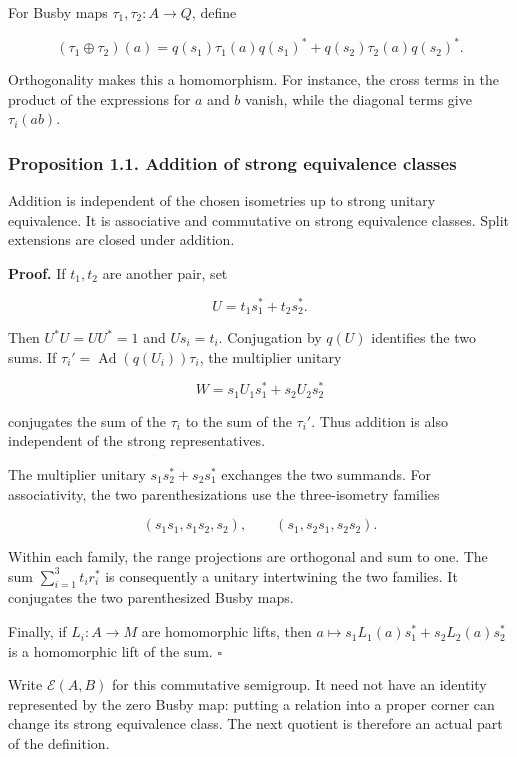 \documentclass[
  11pt,
]{article}
\begin{document}
For Busby maps \(\tau_1,\tau_2:A\to Q\), define

\[
(\tau_1\oplus\tau_2)(a)
=q(s_1)\tau_1(a)q(s_1)^*+q(s_2)\tau_2(a)q(s_2)^*.
\]

Orthogonality makes this a homomorphism. For instance, the cross terms
in the product of the expressions for \(a\) and \(b\) vanish, while the
diagonal terms give \(\tau_i(ab)\).

\subsubsection{Proposition 1.1. Addition of strong equivalence
classes}\label{proposition-1.1.-addition-of-strong-equivalence-classes}

Addition is independent of the chosen isometries up to strong unitary
equivalence. It is associative and commutative on strong equivalence
classes. Split extensions are closed under addition.

\textbf{Proof.} If \(t_1,t_2\) are another pair, set

\[
U=t_1s_1^*+t_2s_2^*.
\]

Then \(U^*U=UU^*=1\) and \(Us_i=t_i\). Conjugation by \(q(U)\)
identifies the two sums. If \(\tau_i'=\operatorname{Ad}(q(U_i))\tau_i\),
the multiplier unitary

\[
W=s_1U_1s_1^*+s_2U_2s_2^*
\]

conjugates the sum of the \(\tau_i\) to the sum of the \(\tau_i'\). Thus
addition is also independent of the strong representatives.

The multiplier unitary \(s_1s_2^*+s_2s_1^*\) exchanges the two summands.
For associativity, the two parenthesizations use the three-isometry
families

\[
(s_1s_1,s_1s_2,s_2),\qquad(s_1,s_2s_1,s_2s_2).
\]

Within each family, the range projections are orthogonal and sum to one.
The sum \(\sum_{i=1}^3t_i r_i^*\) is consequently a unitary intertwining
the two families. It conjugates the two parenthesized Busby maps.

Finally, if \(L_i:A\to M\) are homomorphic lifts, then
\(a\mapsto s_1L_1(a)s_1^*+s_2L_2(a)s_2^*\) is a homomorphic lift of the
sum. \(\square\)

Write \(\mathscr E(A,B)\) for this commutative semigroup. It need not
have an identity represented by the zero Busby map: putting a relation
into a proper corner can change its strong equivalence class. The next
quotient is therefore an actual part of the definition.
\end{document}
